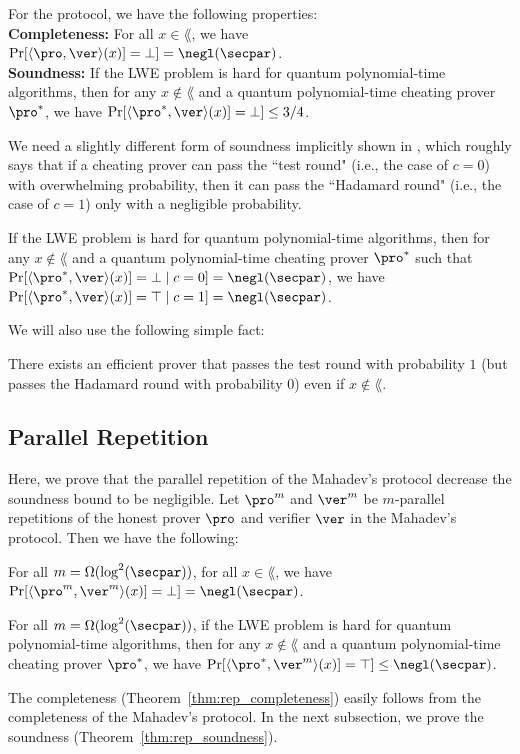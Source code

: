 For the protocol, we have the following properties:\\
\noindent\textbf{Completeness:}
For all $x\in \lang$, we have $\Pr[\langle \pro,\ver \rangle(x)]=\bot]= \negl(\secpar)$.\\
\noindent\textbf{Soundness:}
If the LWE problem is hard for quantum polynomial-time algorithms, then for any $x\notin \lang$ and a quantum polynomial-time cheating prover $\pro^*$, we have  $\Pr[\langle \pro^*,\ver \rangle(x)]=\bot]\leq 3/4$.

We need a slightly different form of soundness implicitly shown in \cite{FOCS:Mahadev18a}, which roughly says that if a cheating prover can pass the ``test round" (i.e., the case of $c=0$) with overwhelming probability, then it can pass the ``Hadamard round" (i.e., the case of $c=1$) only with a negligible probability. 
\begin{lemma}\label{lem:Mah_soundness}
If the LWE problem is hard for quantum polynomial-time algorithms, then for any $x\notin \lang$ and a quantum polynomial-time cheating prover $\pro^*$ such that  $\Pr[\langle \pro^*,\ver \rangle(x)]=\bot\mid c=0]=\negl(\secpar)$, we have $\Pr[\langle \pro^*,\ver \rangle(x)]=\top\mid c=1]=\negl(\secpar)$.
\end{lemma}

We will also use the following simple fact:
\begin{fact}\label{fact:perfectly_pass_test}
There exists an efficient prover that passes the test round with probability $1$ (but passes the Hadamard round with probability $0$) even if $x\notin \lang$. 
\end{fact}

\subsection{Parallel Repetition}
Here, we prove that the parallel repetition of the Mahadev's protocol decrease the soundness bound to be negligible.
Let $\pro^m$ and $\ver^m$ be $m$-parallel repetitions of the honest prover $\pro$ and verifier $\ver$ in the Mahadev's protocol. Then we have the following:
\begin{theorem}[Completeness]\label{thm:rep_completeness}
For all $m= \Omega(\log^2(\secpar))$, for all $x\in \lang$, we have $\Pr[\langle \pro^m,\ver^m \rangle(x)]=\bot]= \negl(\secpar)$.\\
\end{theorem}
\begin{theorem}[Soundness]\label{thm:rep_soundness}
For all $m= \Omega(\log^2(\secpar))$, if the LWE problem is hard for quantum polynomial-time algorithms, then for any $x\notin \lang$ and a quantum polynomial-time cheating prover $\pro^*$, we have  $\Pr[\langle \pro^*,\ver^m \rangle(x)]=\top]\leq \negl(\secpar)$.
\end{theorem}
The completeness (Theorem~\ref{thm:rep_completeness}) easily follows from the completeness of the Mahadev's protocol.
In the next subsection, we prove the soundness (Theorem~\ref{thm:rep_soundness}).

